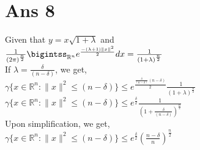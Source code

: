 \documentclass[10pt]{article}
\begin{document}
\section*{Ans 8}
\begin{flushleft}
Given that $ y = x\sqrt{1+\lambda}$ and \\
\vspace{0.5em}
$\frac{1}{(2\pi)^\frac{n}{2}}  \bigintss_{\mathbb{R} ^{n}} e^{\frac{-(\lambda +1)\parallel x \parallel ^{2}}{2}} dx = \frac{1}{(1+\lambda)^{\frac{n}{2}}}$\\
\vspace{0.5em}
If $\lambda = \frac{\delta}{(n - \delta)}$, we get, \\
\vspace{0.5em}
$\gamma\{x \in \mathbb{R} ^{n}: \parallel x \parallel ^{2} \leq (n - \delta)\} \leq e^{\frac{\frac{\delta}{(n - \delta)} (n - \delta)}{2}} \frac{1}{(1+\lambda)^{\frac{n}{2}}}$\\
\vspace{0.5em}
$\gamma\{x \in \mathbb{R} ^{n}: \parallel x \parallel ^{2} \leq (n - \delta)\} \leq e^{\frac{\delta}{2}} \frac{1}{(1+\frac{\delta}{(n - \delta)})^{\frac{n}{2}}}$\\
Upon simplification, we get,\\
\vspace{0.5em}
$\gamma\{x \in \mathbb{R} ^{n}: \parallel x \parallel ^{2} \leq (n - \delta)\} \leq e^{\frac{\delta}{2}} (\frac{n- \delta}{n}) ^ {\frac{n}{2}}$\\
\end{flushleft}
\end{document}
